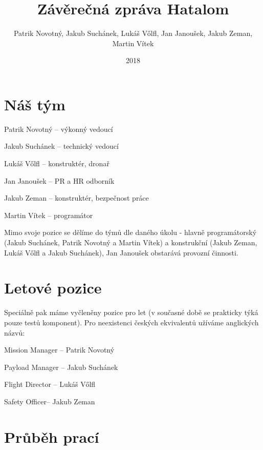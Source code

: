 \documentclass{article}
\title{Závěrečná zpráva Hatalom}
\author{Patrik Novotný, Jakub Suchánek, Lukáš Vőlfl, Jan Janoušek, Jakub Zeman, Martin Vítek}
\date{2018}
\begin{document}
\maketitle
\tableofcontents
\section{Náš tým}
\item Patrik Novotný – výkonný vedoucí
\item Jakub Suchánek – technický vedoucí
\item Lukáš Vőlfl – konstruktér, dronař
\item Jan Janoušek – PR a HR odborník
\item Jakub Zeman – konstruktér, bezpečnost práce
\item Martin Vítek – programátor
\item Mimo svoje pozice se dělíme do týmů dle daného úkolu - hlavně programátorský (Jakub Suchánek, Patrik Novotný a Martin Vítek) a konstrukční (Jakub Zeman, Lukáš Vőlfl a Jakub Suchánek), Jan Janoušek obstarává provozní činnosti.
\section{Letové pozice}
\item Speciálně pak máme vyčleněny pozice pro let (v současné době se prakticky týká pouze testů komponent). Pro neexistenci českých ekvivalentů užíváme anglických názvů:
\item Mission Manager – Patrik Novotný
\item Payload Manager – Jakub Suchánek
\item Flight Director – Lukáš Vőlfl
\item Safety Officer– Jakub Zeman
\section{Průběh prací}
\end{document}
